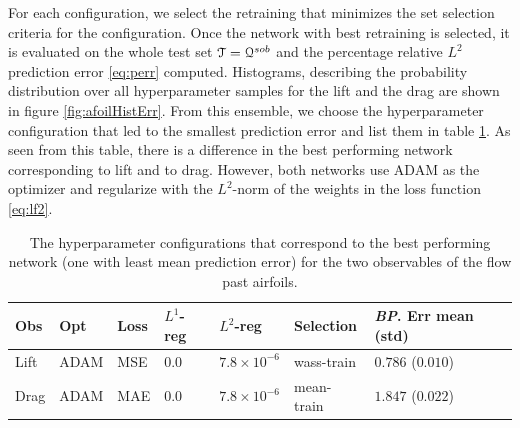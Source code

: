 \documentclass[a4paper]{article}
\numberwithin{equation}{section}
\numberwithin{equation}{section}
\theoremstyle{definition}
\theoremstyle{myremarkstyle}
\newcommand{\test}{\EuScript{T}}
\begin{document}
For each configuration, we select the retraining that minimizes the set selection criteria for the configuration. Once the network with best retraining is selected, it is evaluated on the whole test set $\test =  \EuScript{Q}^{sob}$ and the percentage relative $L^2$ prediction error \eqref{eq:perr} computed. Histograms, describing the probability distribution over all hyperparameter samples for the lift and the drag are shown in figure \ref{fig:afoilHistErr}. From this ensemble, we choose the hyperparameter configuration that led to the smallest prediction error and list them in table \ref{tab:afoilBPNets}. As seen from this table, there is a difference in the best performing network corresponding to lift and to drag. However, both networks use ADAM as the optimizer and regularize with the $L^2$-norm of the weights in the loss function \eqref{eq:lf2}.
\begin{table}[htbp]
\centering
\begin{tabular}{|l|l|l|l|l|l|l|}
\hline
Obs & Opt & Loss & $L^1$-reg & $L^2$-reg & Selection & \emph{BP}. Err mean (std)  \\
\hline
Lift & ADAM & MSE & $0.0$ & $7.8\times 10^{-6}$ & wass-train & $0.786$ ($0.010$) \\
\hline
Drag & ADAM & MAE & $0.0$ & $7.8 \times 10^{-6}$ & mean-train & $1.847$ ($0.022$)  \\
\hline 
\end{tabular}
\caption{The hyperparameter configurations that correspond to the best performing network (one with least mean prediction error) for the two observables of the flow past airfoils.}
\label{tab:afoilBPNets}
\end{table}
\end{document}
